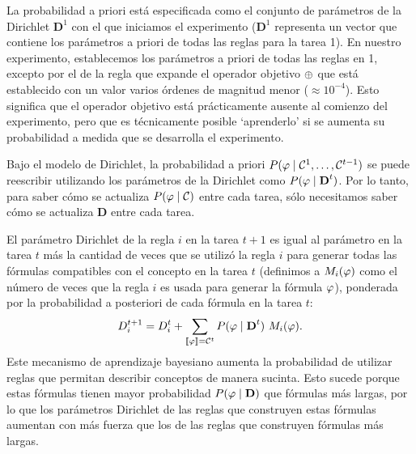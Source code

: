 La probabilidad a priori está especificada como el conjunto de parámetros de la Dirichlet $\textbf{D}^{1}$ con el que iniciamos el experimento ($\textbf{D}^{1}$ representa un vector que contiene los parámetros a priori de todas las reglas para la tarea 1). En nuestro experimento, establecemos los parámetros a priori de todas las reglas en 1, excepto por el de la regla que expande el operador objetivo $\oplus$ que está establecido con un valor varios órdenes de magnitud menor ($\approx 10^{-4}$). Esto significa que el operador objetivo está prácticamente ausente al comienzo del experimento, pero que es técnicamente posible `aprenderlo' si se aumenta su probabilidad a medida que se desarrolla el experimento.


Bajo el modelo de Dirichlet, la probabilidad a priori $P(\varphi\mid \mathcal{C}^{1},\dots,\mathcal{C}^{t-1})$ se puede reescribir utilizando los parámetros de la Dirichlet como $P(\varphi\mid\textbf{D}^{t})$. Por lo tanto, para saber cómo se actualiza $P(\varphi\mid \mathcal{C})$ entre cada tarea, sólo necesitamos saber cómo se actualiza  $\textbf{D}$ entre cada tarea.


El parámetro Dirichlet de la regla $i$ en la tarea $t+1$ es igual al parámetro en la tarea $t$ más la cantidad de veces que se utilizó la regla $i$ para generar todas las fórmulas compatibles con el concepto en la tarea $t$ (definimos a $M_{i}(\varphi)$ como el número de veces que la regla $i$ es usada para generar la fórmula $\varphi$), ponderada por la probabilidad a posteriori de cada fórmula en la tarea $t$:
 \begin{equation}
 D_{i}^{t+1}=D_{i}^{t}+\sum_{\llbracket \varphi\rrbracket=\mathcal{C}^t} P(\varphi\mid \textbf{D}^{t}) \ M_{i}(\varphi). 
 \label{Dirichlet}
 \end{equation}
%
Este mecanismo de aprendizaje bayesiano aumenta la probabilidad de utilizar reglas que permitan describir conceptos de manera sucinta. Esto sucede porque estas fórmulas tienen mayor probabilidad $P(\varphi\mid \textbf{D})$ que fórmulas más largas, por lo que los parámetros Dirichlet de las reglas que construyen estas fórmulas aumentan con más fuerza que los de las reglas que construyen fórmulas más largas.   

